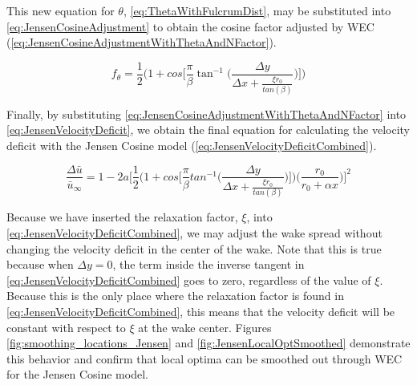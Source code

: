 \documentclass[a4paper]{jpconf}
\begin{document}
This new equation for $\theta$, \cref{eq:ThetaWithFulcrumDist}, may be substituted into \cref{eq:JensenCosineAdjustment} to obtain the cosine factor adjusted by WEC (\cref{eq:JensenCosineAdjustmentWithThetaAndNFactor}).

\begin{equation}
f_\theta = \frac{1}{2} \Bigg( 1 + cos \Bigg[ \frac{\pi}{\beta} \tan^{-1}\Bigg( \frac{\Delta y}{\Delta x + \frac{\xi r_0}{tan(\beta)}} \Bigg) \Bigg] \Bigg)
\label{eq:JensenCosineAdjustmentWithThetaAndNFactor}
\end{equation}

Finally, by substituting \cref{eq:JensenCosineAdjustmentWithThetaAndNFactor} into \cref{eq:JensenVelocityDeficit}, we obtain the final equation for calculating the velocity deficit with the Jensen Cosine model (\cref{eq:JensenVelocityDeficitCombined}).

\begin{equation}
\frac{\Delta \bar{u}}{\bar{u}_\infty} = 1 - 2a \Bigg[ \frac{1}{2} \Bigg(1 + cos\Bigg[\frac{\pi}{\beta} tan^{-1}\Bigg(\frac{\Delta y}{\Delta x + \frac{\xi r_0}{tan(\beta)}} \Bigg) \Bigg] \Bigg) \bigg(\frac{r_0}{r_0 + \alpha x} \bigg) \Bigg]^2
\label{eq:JensenVelocityDeficitCombined}
\end{equation}

Because we have inserted the relaxation factor, $\xi$, into \cref{eq:JensenVelocityDeficitCombined}, we may adjust the wake spread without changing the velocity deficit in the center of the wake. Note that this is true because when $\Delta y = 0$, the term inside the inverse tangent in \cref{eq:JensenVelocityDeficitCombined} goes to zero, regardless of the value of $\xi$. Because this is the only place where the relaxation factor is found in \cref{eq:JensenVelocityDeficitCombined}, this means that the velocity deficit will be constant with respect to $\xi$ at the wake center. Figures \ref{fig:smoothing_locations_Jensen} and \ref{fig:JensenLocalOptSmoothed} demonstrate this behavior and confirm that local optima can be smoothed out through WEC for the Jensen Cosine model.
\end{document}
